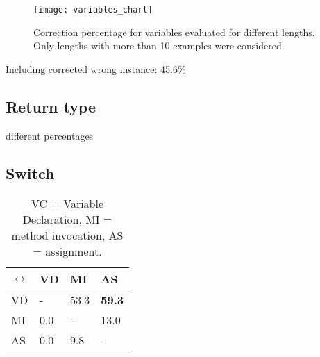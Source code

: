 \begin{figure}[p]
\centering
\texttt{[image: variables\_chart]}
\caption{Correction percentage for variables evaluated for different lengths. Only lengths with more than 10 examples were considered.}
\label{variables_chart}
\end{figure}

Including corrected wrong instance: 45.6\%

\subsection{Return type}

different percentages

\subsection{Switch}

\begin{table}[h]
\begin{tabular}{ | m{1cm} | m{1cm} | m{1cm} | m{1cm} | }
  \hline
  \(\leftrightarrow\) & VD & MI & AS \\
  \hline
  \hline
  VD & - & 53.3 & \textbf{59.3} \\
  \hline
  MI & 0.0 & - & 13.0 \\
  \hline
  AS & 0.0 & 9.8 & - \\
  \hline
\end{tabular}
\caption{VC = Variable Declaration, MI = method invocation, AS = assignment.}
\label{switch_table}
\end{table}
